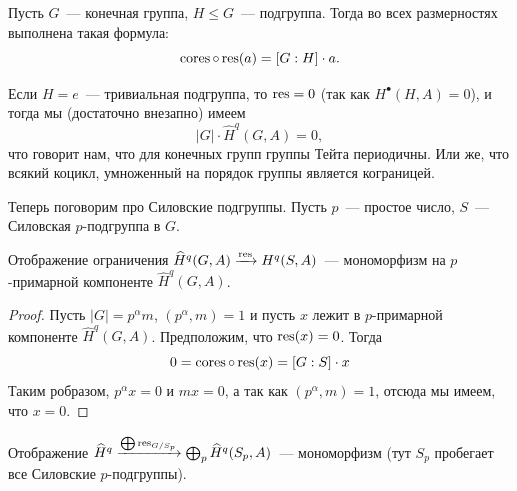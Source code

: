 	 \begin{theorem} 
	 	Пусть $G$~--- конечная группа, $H \le G$~--- подгруппа. Тогда во всех размерностях выполнена такая формула: 
	 	\[
	 		\operatorname{cores} \circ \operatorname{res}(a) = [G : H] \cdot a.
	 	\]
	 \end{theorem}

	 \begin{corollary}
	 	Если $H = e$~--- тривиальная подгруппа, то $\operatorname{res} = 0$ (так как $H^{\bullet}(H, A) = 0$),  и тогда мы (достаточно внезапно) имеем 
	 	\[
	 	 		|G| \cdot \widehat{H}^{q}(G, A) = 0,
 		\] 		
 		что говорит нам, что для конечных групп группы Тейта периодичны. Или же, что всякий коцикл, умноженный на порядок группы является кограницей. 
	 \end{corollary}

    Теперь поговорим про Силовские подгруппы. Пусть $p$~--- простое число, $S$~--- Силовская $p$-подгруппа в $G$. 

	 \begin{corollary}
	 	Отображение ограничения $\widehat{H}^q(G, A) \xrightarrow{\operatorname{res}} H^{q}(S, A)$~--- мономорфизм на $p$-примарной компоненте $\widehat{H}^q(G, A)$.  
	 \end{corollary}
	 \begin{proof}
	 	Пусть $|G| = p^{\alpha}m$, $(p^{\alpha}, m) = 1$ и пусть $x$ лежит в $p$-примарной компоненте $\widehat{H}^q(G, A)$. Предположим, что $\operatorname{res}(x) = 0$. Тогда 
	 	\[
	 		0 = \operatorname{cores} \circ \operatorname{res}(x) = [G : S] \cdot x
	 	\]
	 	Таким робразом, $p^{\alpha} x = 0$ и $m x = 0$, а так как $(p^{\alpha}, m) = 1$, отсюда мы имеем, что $x = 0$. 
	 \end{proof}

	 \begin{corollary}\label{Sylow_subgroups_mono}
	 	Отображение $\widehat{H}^q \xrightarrow{\bigoplus \operatorname{res}_{G/S_p}} \bigoplus_{p} \widehat{H}^{q}(S_p, A)$~--- мономорфизм (тут $S_p$ пробегает все Силовские $p$-подгруппы).
	 \end{corollary}
	 





